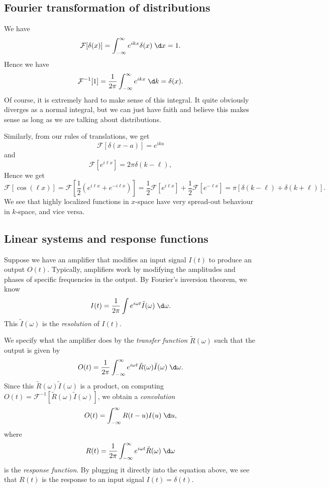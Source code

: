 \documentclass[a4paper]{article}
\begin{document}
\subsection{Fourier transformation of distributions}
We have
\[
  \mathcal{F}[\delta(x)] = \int_{-\infty}^\infty e^{ikx} \delta (x)\;\d x = 1.
\]
Hence we have
\[
  \mathcal{F}^{-1}[1] = \frac{1}{2\pi} \int_{-\infty}^\infty e^{ikx}\;\d k = \delta (x).
\]
Of course, it is extremely hard to make sense of this integral. It quite obviously diverges as a normal integral, but we can just have faith and believe this makes sense as long as we are talking about distributions.

Similarly, from our rules of translations, we get
\[
  \mathcal{F}[\delta(x - a)] = e^{ika}
\]
and
\[
  \mathcal{F}[e^{i\ell x}] = 2\pi \delta(k - \ell),
\]
Hence we get
\[
  \mathcal{F}[\cos (\ell x)] = \mathcal{F}\left[\frac{1}{2}( e^{i\ell x} + e^{-i\ell x})\right] = \frac{1}{2} \mathcal{F}[e^{i\ell x}] + \frac{1}{2} \mathcal{F}[e^{-\ell x}] = \pi [\delta (k - \ell) + \delta(k + \ell)].
\]
We see that highly localized functions in $x$-space have very spread-out behaviour in $k$-space, and vice versa.

\subsection{Linear systems and response functions}
Suppose we have an amplifier that modifies an input signal $I(t)$ to produce an output $O(t)$. Typically, amplifiers work by modifying the amplitudes and phases of specific frequencies in the output. By Fourier's inversion theorem, we know
\[
  I(t) = \frac{1}{2\pi} \int e^{i\omega t} \tilde{I}(\omega) \;\d \omega.
\]
This $\tilde{I}(\omega)$ is the \emph{resolution} of $I(t)$.

We specify what the amplifier does by the \emph{transfer function} $\tilde{R}(\omega)$ such that the output is given by
\[
  O(t) = \frac{1}{2\pi} \int_{-\infty}^\infty e^{i\omega t} \tilde{R}(\omega) \tilde{I}(\omega)\;\d \omega.
\]
Since this $\tilde{R}(\omega) \tilde{I}(\omega)$ is a product, on computing $O(t) = \mathcal{F}^{-1}[\tilde{R}(\omega) \tilde{I}(\omega)]$, we obtain a \emph{convolution}
\[
  O(t) = \int_{-\infty}^\infty R(t - u) I(u)\;\d u,
\]
where
\[
  R(t) = \frac{1}{2\pi} \int_{-\infty}^\infty e^{i\omega t} \tilde{R}(\omega) \;\d \omega
\]
is the \emph{response function}. By plugging it directly into the equation above, we see that $R(t)$ is the response to an input signal $I(t) = \delta(t)$.
\end{document}
